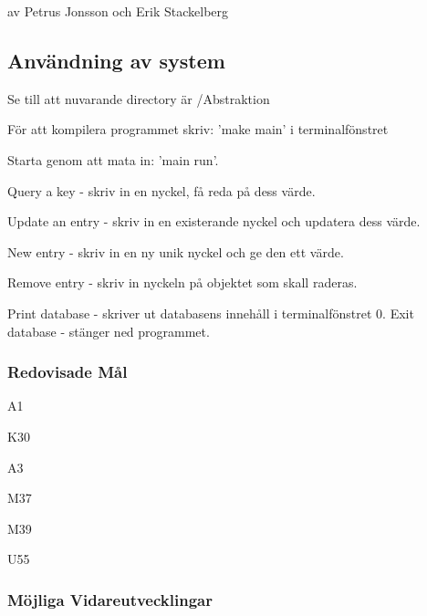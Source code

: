 av Petrus Jonsson och Erik Stackelberg

\subsection*{Användning av system}


\begin{DoxyItemize}
\item Se till att nuvarande directory är /\+Abstraktion
\item För att kompilera programmet skriv\+: 'make main' i terminalfönstret
\item Starta genom att mata in\+: 'main run'.
\begin{DoxyEnumerate}
\item Query a key -\/ skriv in en nyckel, få reda på dess värde.
\item Update an entry -\/ skriv in en existerande nyckel och updatera dess värde.
\item New entry -\/ skriv in en ny unik nyckel och ge den ett värde.
\item Remove entry -\/ skriv in nyckeln på objektet som skall raderas.
\item Print database -\/ skriver ut databasens innehåll i terminalfönstret 0. Exit database -\/ stänger ned programmet.
\end{DoxyEnumerate}
\end{DoxyItemize}

\subsubsection*{Redovisade Mål}


\begin{DoxyItemize}
\item A1
\item K30
\item A3
\item M37
\item M39
\item U55
\end{DoxyItemize}

\subsubsection*{Möjliga Vidareutvecklingar}